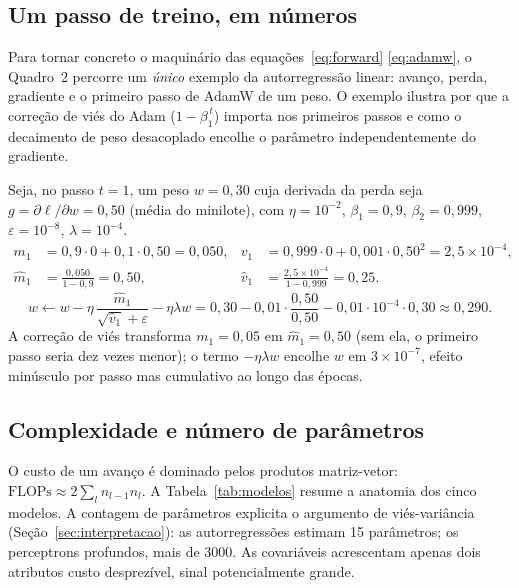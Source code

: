 \documentclass[12pt,a4paper,oneside]{article}
\begin{document}
\subsection{Um passo de treino, em números}

Para tornar concreto o maquinário das equações~\eqref{eq:forward}\textendash
\eqref{eq:adamw}, o Quadro~2 percorre um \emph{único}
exemplo da autorregressão linear: avanço, perda, gradiente e o primeiro
passo de AdamW de um peso. O exemplo ilustra por que a correção de viés do
Adam ($1-\beta_1^{\,t}$) importa nos primeiros passos e como o decaimento de
peso desacoplado encolhe o parâmetro independentemente do gradiente.

\begin{tcolorbox}[colback=black!2,colframe=black!35,boxrule=0.5pt,
  left=8pt,right=8pt,top=6pt,bottom=6pt,
  title=\textbf{Quadro 2 \textendash{} Um passo de AdamW para um peso (ilustrativo)}]
\small{}
Seja, no passo $t=1$, um peso $w=0{,}30$ cuja derivada da perda seja
$g=\partial\ell/\partial w=0{,}50$ (média do minilote), com
$\eta=10^{-2}$, $\beta_1=0{,}9$, $\beta_2=0{,}999$, $\varepsilon=10^{-8}$,
$\lambda=10^{-4}$.
\begin{align*}
m_1 &= 0{,}9\cdot 0 + 0{,}1\cdot 0{,}50 = 0{,}050, &
v_1 &= 0{,}999\cdot 0 + 0{,}001\cdot 0{,}50^2 = 2{,}5\times 10^{-4},\\
\widehat{m}_1 &= \tfrac{0{,}050}{1-0{,}9} = 0{,}50, &
\widehat{v}_1 &= \tfrac{2{,}5\times 10^{-4}}{1-0{,}999} = 0{,}25.
\end{align*}
\[
w \leftarrow w - \eta\,\frac{\widehat{m}_1}{\sqrt{\widehat{v}_1}+\varepsilon}
 - \eta\lambda w
 = 0{,}30 - 0{,}01\cdot\frac{0{,}50}{0{,}50} - 0{,}01\cdot 10^{-4}\cdot 0{,}30 \approx 0{,}290.
\]
A correção de viés transforma $m_1=0{,}05$ em $\widehat{m}_1=0{,}50$ (sem
ela, o primeiro passo seria dez vezes menor); o termo $-\eta\lambda w$
encolhe $w$ em $3\times 10^{-7}$, efeito minúsculo por passo mas cumulativo
ao longo das épocas.
\end{tcolorbox}

\subsection{Complexidade e número de parâmetros}

O custo de um avanço é dominado pelos produtos matriz-vetor:
$\mathrm{FLOPs}\approx 2\sum_l n_{l-1}n_l$. A Tabela~\ref{tab:modelos}
resume a anatomia dos cinco modelos. A contagem de parâmetros explicita o
argumento de viés-variância (Seção~\ref{sec:interpretacao}): as
autorregressões estimam 15 parâmetros; os perceptrons
profundos, mais de \num{3000}. As covariáveis acrescentam apenas dois
atributos \textemdash{} custo desprezível, sinal potencialmente grande.
\end{document}
